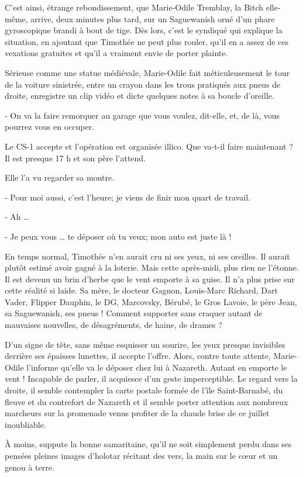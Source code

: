 C’est ainsi, étrange rebondissement, que Marie-Odile Tremblay, la Bitch elle-même, arrive, deux minutes plus tard, sur un Saguewanish orné d’un phare gyroscopique brandi à bout de tige. Dès lors, c’est le syndiqué qui explique la situation, en ajoutant que Timothée ne peut plus rouler, qu’il en a assez de ces vexations gratuites et qu’il a vraiment envie de porter plainte.

Sérieuse comme une statue médiévale, Marie-Odile fait méticuleusement le tour de la voiture sinistrée, entre un crayon dans les trous pratiqués aux pneus de droite, enregistre un clip vidéo et dicte quelques notes à sa boucle d’oreille.

- On va la faire remorquer au garage que vous voulez, dit-elle, et, de là, vous pourrez vous en occuper.

Le CS-1 accepte et l’opération est organisée illico. Que va-t-il faire maintenant ? Il est presque 17 h et son père l’attend.

Elle l’a vu regarder sa montre.

- Pour moi aussi, c’est l’heure; je viens de finir mon quart de travail.

- Ah …

- Je peux vous … te déposer où tu veux; mon auto est juste là !

En temps normal, Timothée n’en aurait cru ni ses yeux, ni ses oreilles. Il aurait plutôt estimé avoir gagné à la loterie. Mais cette après-midi, plus rien ne l’étonne. Il est devenu un brin d’herbe que le vent emporte à sa guise. Il n’a plus prise sur cette réalité si laide. Sa mère, le docteur Gagnon, Louis-Marc Richard, Dart Vader, Flipper Dauphin, le DG, Marcovsky, Bérubé, le Gros Lavoie, le père Jean, sa Saguewanish, ses pneus ! Comment supporter sans craquer autant de mauvaises nouvelles, de désagréments, de haine, de drames ?

D’un signe de tête, sans même esquisser un sourire, les yeux presque invisibles derrière ses épaisses lunettes, il accepte l’offre. Alors, contre toute attente, Marie-Odile l’informe qu’elle va le déposer chez lui à Nazareth. Autant en emporte le vent ! Incapable de parler, il acquiesce d’un geste imperceptible. Le regard vers la droite, il semble contempler la carte postale formée de l’île Saint-Barnabé, du fleuve et du contrefort de Nazareth et il semble porter attention aux nombreux marcheurs sur la promenade venus profiter de la chaude brise de ce juillet inoubliable.

À moins, suppute la bonne samaritaine, qu’il ne soit simplement perdu dans ses pensées pleines images d’holotar récitant des vers, la main sur le cœur et un genou à terre.

